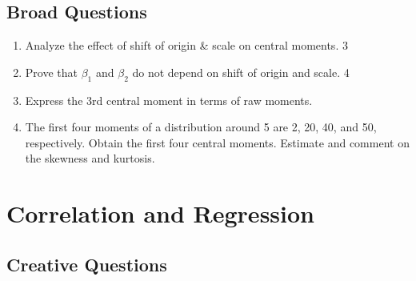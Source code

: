 \documentclass[a4paper,oneside]{book}
\begin{document}
\section{Broad Questions}
    \begin{enumerate}
    \item Analyze the effect of shift of origin \& scale on central moments. \hfill 3
    \item Prove that $\beta_1$ and $\beta_2$ do not depend on shift of origin and scale. \hfill 4
    \item Express the 3rd central moment in terms of raw moments. 
    \item The first four moments of a distribution around 5 are 2, 20, 40, and 50, respectively. Obtain the first four central moments. Estimate and comment on the skewness and kurtosis. 
    \end{enumerate}

\chapter{Correlation and Regression} 
\section{Creative Questions}
\end{document}
